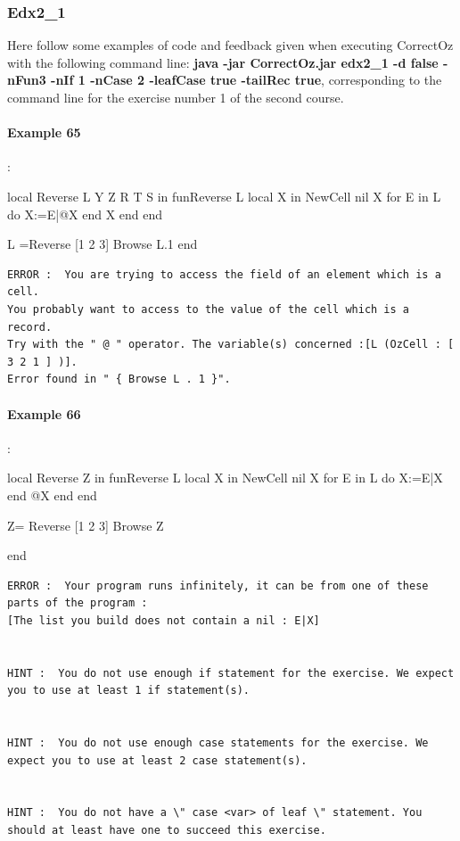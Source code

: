 \documentclass[11pt,a4paper,twoside,openright]{report}
\begin{document}
\subsubsection{Edx2\_1}
Here follow some examples of code and feedback given when executing 
CorrectOz with the following command line: \textbf{java -jar CorrectOz.jar edx2\_1 
-d false -nFun3 -nIf 1 -nCase 2 -leafCase true -tailRec true}, corresponding 
to the command line for the exercise number 1 of the second course.

\paragraph{Example 65}:

\begin{OZ}
local Reverse L  Y Z R T S in
	fun{Reverse L}
		local X in
		    {NewCell nil X}
			for E in L do
				X:=E|@X
		   	end
		   	X
		end
	end

L ={Reverse [1 2 3]}
{Browse L.1}
end
\end{OZ}

\begin{lstlisting}
ERROR :  You are trying to access the field of an element which is a cell. 
You probably want to access to the value of the cell which is a record. 
Try with the " @ " operator. The variable(s) concerned :[L (OzCell : [ 3 2 1 ] )]. 
Error found in " { Browse L . 1 }".

\end{lstlisting}

\paragraph{Example 66}:

\begin{OZ}
local Reverse Z in
	fun{Reverse L}
		local X in
		    {NewCell nil X}
			for E in L do
				X:=E|X
		   	end
		   	@X
		end
	end

Z= {Reverse [1 2 3]}
{Browse Z}

end
\end{OZ}

\begin{lstlisting}
ERROR :  Your program runs infinitely, it can be from one of these parts of the program : 
[The list you build does not contain a nil : E|X]


HINT :  You do not use enough if statement for the exercise. We expect you to use at least 1 if statement(s).


HINT :  You do not use enough case statements for the exercise. We expect you to use at least 2 case statement(s).


HINT :  You do not have a \" case <var> of leaf \" statement. You should at least have one to succeed this exercise.

\end{lstlisting}
\end{document}
